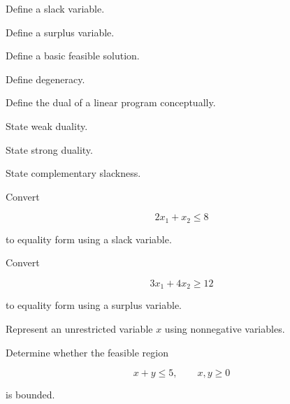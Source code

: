 \begin{exercise}[1]
Define a slack variable.
\end{exercise}

\begin{exercise}[1]
Define a surplus variable.
\end{exercise}

\begin{exercise}[1]
Define a basic feasible solution.
\end{exercise}

\begin{exercise}[1]
Define degeneracy.
\end{exercise}

\begin{exercise}[1]
Define the dual of a linear program conceptually.
\end{exercise}

\begin{exercise}[1]
State weak duality.
\end{exercise}

\begin{exercise}[1]
State strong duality.
\end{exercise}

\begin{exercise}[1]
State complementary slackness.
\end{exercise}

\begin{exercise}[2]
Convert

\[
2x_1+x_2\leq8
\]

to equality form using a slack variable.
\end{exercise}

\begin{exercise}[2]
Convert

\[
3x_1+4x_2\geq12
\]

to equality form using a surplus variable.
\end{exercise}

\begin{exercise}[2]
Represent an unrestricted variable \(x\) using nonnegative variables.
\end{exercise}

\begin{exercise}[2]
Determine whether the feasible region

\[
x+y\leq5,
\qquad
x,y\geq0
\]

is bounded.
\end{exercise}

